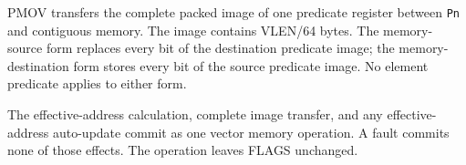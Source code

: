 PMOV transfers the complete packed image of one predicate register between
\texttt{Pn} and contiguous memory.  The image contains VLEN/64 bytes.  The
memory-source form replaces every bit of the destination predicate image; the
memory-destination form stores every bit of the source predicate image.  No
element predicate applies to either form.

The effective-address calculation, complete image transfer, and any
effective-address auto-update commit as one vector memory operation.  A fault
commits none of those effects.  The operation leaves FLAGS unchanged.
